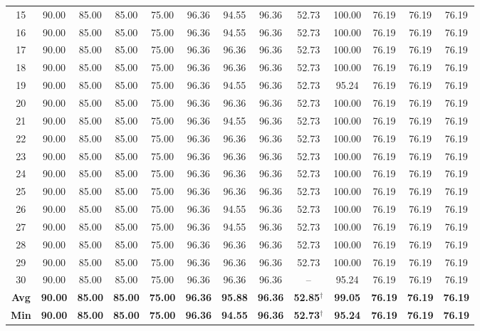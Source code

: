 \begin{table}
{\begin{tabular}{|c|cccc|cccc|cccc|}
15 & 90.00 & 85.00 & 85.00 & 75.00 & 96.36 & 94.55 & 96.36 & 52.73 & 100.00 & 76.19 & 76.19 & 76.19 \\
16 & 90.00 & 85.00 & 85.00 & 75.00 & 96.36 & 94.55 & 96.36 & 52.73 & 100.00 & 76.19 & 76.19 & 76.19 \\
17 & 90.00 & 85.00 & 85.00 & 75.00 & 96.36 & 96.36 & 96.36 & 52.73 & 100.00 & 76.19 & 76.19 & 76.19 \\
18 & 90.00 & 85.00 & 85.00 & 75.00 & 96.36 & 96.36 & 96.36 & 52.73 & 100.00 & 76.19 & 76.19 & 76.19 \\
19 & 90.00 & 85.00 & 85.00 & 75.00 & 96.36 & 94.55 & 96.36 & 52.73 & 95.24 & 76.19 & 76.19 & 76.19 \\
20 & 90.00 & 85.00 & 85.00 & 75.00 & 96.36 & 96.36 & 96.36 & 52.73 & 100.00 & 76.19 & 76.19 & 76.19 \\
21 & 90.00 & 85.00 & 85.00 & 75.00 & 96.36 & 94.55 & 96.36 & 52.73 & 100.00 & 76.19 & 76.19 & 76.19 \\
22 & 90.00 & 85.00 & 85.00 & 75.00 & 96.36 & 96.36 & 96.36 & 52.73 & 100.00 & 76.19 & 76.19 & 76.19 \\
23 & 90.00 & 85.00 & 85.00 & 75.00 & 96.36 & 96.36 & 96.36 & 52.73 & 100.00 & 76.19 & 76.19 & 76.19 \\
24 & 90.00 & 85.00 & 85.00 & 75.00 & 96.36 & 96.36 & 96.36 & 52.73 & 100.00 & 76.19 & 76.19 & 76.19 \\
25 & 90.00 & 85.00 & 85.00 & 75.00 & 96.36 & 96.36 & 96.36 & 52.73 & 100.00 & 76.19 & 76.19 & 76.19 \\
26 & 90.00 & 85.00 & 85.00 & 75.00 & 96.36 & 94.55 & 96.36 & 52.73 & 100.00 & 76.19 & 76.19 & 76.19 \\
27 & 90.00 & 85.00 & 85.00 & 75.00 & 96.36 & 94.55 & 96.36 & 52.73 & 100.00 & 76.19 & 76.19 & 76.19 \\
28 & 90.00 & 85.00 & 85.00 & 75.00 & 96.36 & 96.36 & 96.36 & 52.73 & 100.00 & 76.19 & 76.19 & 76.19 \\
29 & 90.00 & 85.00 & 85.00 & 75.00 & 96.36 & 96.36 & 96.36 & 52.73 & 100.00 & 76.19 & 76.19 & 76.19 \\
30 & 90.00 & 85.00 & 85.00 & 75.00 & 96.36 & 96.36 & 96.36 & -- & 95.24 & 76.19 & 76.19 & 76.19 \\
\hline
\textbf{Avg} & \textbf{90.00} & \textbf{85.00} & \textbf{85.00} & \textbf{75.00} & \textbf{96.36} & \textbf{95.88} & \textbf{96.36} & \textbf{52.85}$^{\dagger}$ & \textbf{99.05} & \textbf{76.19} & \textbf{76.19} & \textbf{76.19} \\
\textbf{Min} & \textbf{90.00} & \textbf{85.00} & \textbf{85.00} & \textbf{75.00} & \textbf{96.36} & \textbf{94.55} & \textbf{96.36} & \textbf{52.73}$^{\dagger}$ & \textbf{95.24} & \textbf{76.19} & \textbf{76.19} & \textbf{76.19} \\

\end{tabular}}
\end{table}

